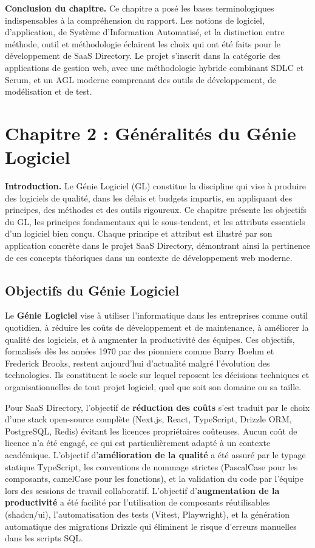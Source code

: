 \textbf{Conclusion du chapitre.} Ce chapitre a posé les bases terminologiques indispensables à la compréhension du rapport. Les notions de logiciel, d'application, de Système d'Information Automatisé, et la distinction entre méthode, outil et méthodologie éclairent les choix qui ont été faits pour le développement de SaaS Directory. Le projet s'inscrit dans la catégorie des applications de gestion web, avec une méthodologie hybride combinant SDLC et Scrum, et un AGL moderne comprenant des outils de développement, de modélisation et de test.


\section{Chapitre 2 : Généralités du Génie Logiciel}

\textbf{Introduction.} Le Génie Logiciel (GL) constitue la discipline qui vise à produire des logiciels de qualité, dans les délais et budgets impartis, en appliquant des principes, des méthodes et des outils rigoureux. Ce chapitre présente les objectifs du GL, les principes fondamentaux qui le sous-tendent, et les attributs essentiels d'un logiciel bien conçu. Chaque principe et attribut est illustré par son application concrète dans le projet SaaS Directory, démontrant ainsi la pertinence de ces concepts théoriques dans un contexte de développement web moderne.

\subsection{Objectifs du Génie Logiciel}

Le \textbf{Génie Logiciel} vise à utiliser l'informatique dans les entreprises comme outil quotidien, à réduire les coûts de développement et de maintenance, à améliorer la qualité des logiciels, et à augmenter la productivité des équipes. Ces objectifs, formalisés dès les années 1970 par des pionniers comme Barry Boehm et Frederick Brooks, restent aujourd'hui d'actualité malgré l'évolution des technologies. Ils constituent le socle sur lequel reposent les décisions techniques et organisationnelles de tout projet logiciel, quel que soit son domaine ou sa taille.

Pour SaaS Directory, l'objectif de \textbf{réduction des coûts} s'est traduit par le choix d'une stack open-source complète (Next.js, React, TypeScript, Drizzle ORM, PostgreSQL, Redis) évitant les licences propriétaires coûteuses. Aucun coût de licence n'a été engagé, ce qui est particulièrement adapté à un contexte académique. L'objectif d'\textbf{amélioration de la qualité} a été assuré par le typage statique TypeScript, les conventions de nommage strictes (PascalCase pour les composants, camelCase pour les fonctions), et la validation du code par l'équipe lors des sessions de travail collaboratif. L'objectif d'\textbf{augmentation de la productivité} a été facilité par l'utilisation de composants réutilisables (shadcn/ui), l'automatisation des tests (Vitest, Playwright), et la génération automatique des migrations Drizzle qui éliminent le risque d'erreurs manuelles dans les scripts SQL.

